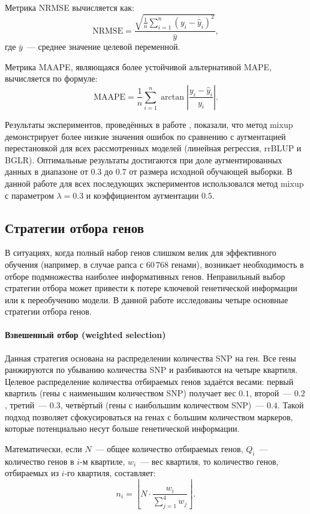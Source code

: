 Метрика NRMSE вычисляется как:
\[
\text{NRMSE} = \frac{\sqrt{\frac{1}{n}\sum_{i=1}^{n}(y_i - \hat{y}_i)^2}}{\bar{y}},
\]
где $\bar{y}$~--- среднее значение целевой переменной.

Метрика MAAPE, являющаяся более устойчивой альтернативой MAPE, 
вычисляется по формуле:
\[
\text{MAAPE} = \frac{1}{n}\sum_{i=1}^{n} \arctan\left|\frac{y_i - \hat{y}_i}{y_i}\right|.
\]

Результаты экспериментов, проведённых в работе \cite{Reutov2025}, показали, 
что метод mixup демонстрирует более низкие значения ошибок по сравнению 
с аугментацией перестановкой для всех рассмотренных моделей (линейная 
регрессия, rrBLUP и BGLR). Оптимальные результаты достигаются при доле 
аугментированных данных в диапазоне от $0.3$ до $0.7$ от размера исходной 
обучающей выборки. В данной работе для всех последующих экспериментов 
использовался метод mixup с параметром $\lambda = 0.3$ и коэффициентом 
аугментации $0.5$.

\subsection{Стратегии отбора генов}
\label{ch2:gene_selection}

В ситуациях, когда полный набор генов слишком велик для эффективного 
обучения (например, в случае рапса с $60\,768$ генами), возникает 
необходимость в отборе подмножества наиболее информативных генов. 
Неправильный выбор стратегии отбора может привести к потере ключевой 
генетической информации или к переобучению модели. В данной работе 
исследованы четыре основные стратегии отбора генов.

\paragraph{Взвешенный отбор (weighted selection)}

Данная стратегия основана на распределении количества SNP на ген. 
Все гены ранжируются по убыванию количества SNP и разбиваются на 
четыре квартиля. Целевое распределение количества отбираемых генов 
задаётся весами: первый квартиль (гены с наименьшим количеством SNP) 
получает вес $0.1$, второй~--- $0.2$, третий~--- $0.3$, четвёртый 
(гены с наибольшим количеством SNP)~--- $0.4$. Такой подход позволяет 
сфокусироваться на генах с большим количеством маркеров, которые 
потенциально несут больше генетической информации.

Математически, если $N$~--- общее количество отбираемых генов, 
$Q_i$~--- количество генов в $i$-м квартиле, $w_i$~--- вес квартиля, 
то количество генов, отбираемых из $i$-го квартиля, составляет:
\[
n_i = \left\lfloor N \cdot \frac{w_i}{\sum_{j=1}^{4} w_j} \right\rfloor.
\]

